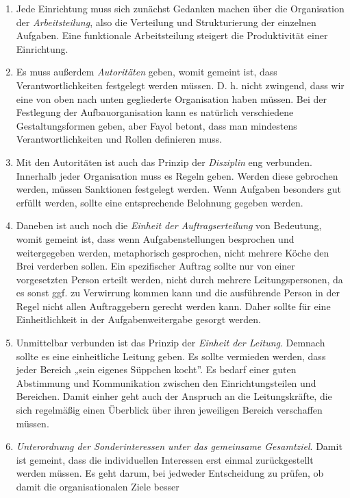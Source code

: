 \documentclass[
  letterpaper,
]{book}
\begin{document}
\begin{enumerate}
\def\labelenumi{\arabic{enumi}.}
\item
  Jede Einrichtung muss sich zunächst Gedanken machen über die
  Organisation der \emph{Arbeitsteilung}, also die Verteilung und
  Strukturierung der einzelnen Aufgaben. Eine funktionale Arbeitsteilung
  steigert die Produktivität einer Einrichtung.
\item
  Es muss außerdem \emph{Autoritäten} geben, womit gemeint ist, dass
  Verantwortlichkeiten festgelegt werden müssen. D. h. nicht zwingend,
  dass wir eine von oben nach unten gegliederte Organisation haben
  müssen. Bei der Festlegung der Aufbauorganisation kann es natürlich
  verschiedene Gestaltungsformen geben, aber Fayol betont, dass man
  mindestens Verantwortlichkeiten und Rollen definieren muss.
\item
  Mit den Autoritäten ist auch das Prinzip der \emph{Disziplin} eng
  verbunden. Innerhalb jeder Organisation muss es Regeln geben. Werden
  diese gebrochen werden, müssen Sanktionen festgelegt werden. Wenn
  Aufgaben besonders gut erfüllt werden, sollte eine entsprechende
  Belohnung gegeben werden.
\item
  Daneben ist auch noch die \emph{Einheit der Auftragserteilung} von
  Bedeutung, womit gemeint ist, dass wenn Aufgabenstellungen besprochen
  und weitergegeben werden, metaphorisch gesprochen, nicht mehrere Köche
  den Brei verderben sollen. Ein spezifischer Auftrag sollte nur von
  einer vorgesetzten Person erteilt werden, nicht durch mehrere
  Leitungspersonen, da es sonst ggf. zu Verwirrung kommen kann und die
  ausführende Person in der Regel nicht allen Auftraggebern gerecht
  werden kann. Daher sollte für eine Einheitlichkeit in der
  Aufgabenweitergabe gesorgt werden.
\item
  Unmittelbar verbunden ist das Prinzip der \emph{Einheit der Leitung}.
  Demnach sollte es eine einheitliche Leitung geben. Es sollte vermieden
  werden, dass jeder Bereich „sein eigenes Süppchen kocht''. Es bedarf
  einer guten Abstimmung und Kommunikation zwischen den
  Einrichtungsteilen und Bereichen. Damit einher geht auch der Anspruch
  an die Leitungskräfte, die sich regelmäßig einen Überblick über ihren
  jeweiligen Bereich verschaffen müssen.
\item
  \emph{Unterordnung der Sonderinteressen unter das gemeinsame
  Gesamtziel}. Damit ist gemeint, dass die individuellen Interessen erst
  einmal zurückgestellt werden müssen. Es geht darum, bei jedweder
  Entscheidung zu prüfen, ob damit die organisationalen Ziele besser

\end{enumerate}
\end{document}
